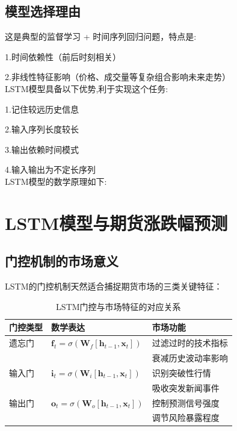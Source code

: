 \documentclass[a4paper,11pt]{ctexart}
\begin{document}
\newpage
\subsection{模型选择理由}

这是典型的监督学习 + 时间序列回归问题，特点是:

1.时间依赖性（前后时刻相关）

2.非线性特征影响（价格、成交量等复杂组合影响未来走势）\\

LSTM模型具备以下优势,利于实现这个任务:

1.记住较远历史信息

2.输入序列长度较长

3.输出依赖时间模式

4.输入输出为不定长序列\\

LSTM模型的数学原理如下:

\section*{LSTM模型与期货涨跌幅预测}
\subsection*{门控机制的市场意义}
LSTM的门控机制天然适合捕捉期货市场的三类关键特征：

\begin{table}[h]
\centering
\caption{LSTM门控与市场特征的对应关系}
\begin{tabular}{lll}
\toprule
门控类型 & 数学表达 & 市场功能 \\
\midrule
遗忘门 & $\mathbf{f}_t=\sigma(\mathbf{W}_f[\mathbf{h}_{t-1},\mathbf{x}_t])$ & 过滤过时的技术指标 \\
 & & 衰减历史波动率影响 \\
输入门 & $\mathbf{i}_t=\sigma(\mathbf{W}_i[\mathbf{h}_{t-1},\mathbf{x}_t])$ & 识别突破性行情 \\
 & & 吸收突发新闻事件 \\
输出门 & $\mathbf{o}_t=\sigma(\mathbf{W}_o[\mathbf{h}_{t-1},\mathbf{x}_t])$ & 控制预测信号强度 \\
 & & 调节风险暴露程度 \\
\bottomrule
\end{tabular}
\end{table}
\end{document}
